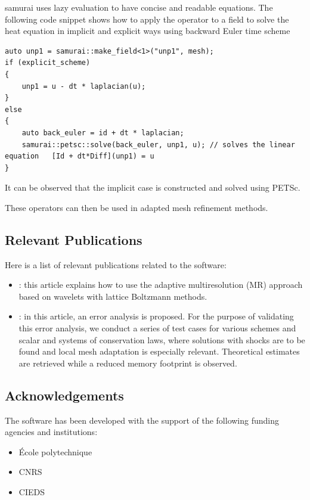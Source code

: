 samurai uses lazy evaluation to have concise and readable equations. The following code snippet shows how to apply the operator to a field to solve the heat equation in implicit and explicit ways using backward Euler time scheme

\begin{listing}[ht]
    \begin{verbatim}
auto unp1 = samurai::make_field<1>("unp1", mesh);
if (explicit_scheme)
{
    unp1 = u - dt * laplacian(u);
}
else
{
    auto back_euler = id + dt * laplacian;
    samurai::petsc::solve(back_euler, unp1, u); // solves the linear equation   [Id + dt*Diff](unp1) = u
}
\end{verbatim}
\end{listing}

It can be observed that the implicit case is constructed and solved using PETSc.

These operators can then be used in adapted mesh refinement methods.

\subsection{Relevant Publications}
\label{sec:Samurai:publications}

Here is a list of relevant publications related to the software:

\begin{itemize}
    \item \cite{bellotti_multidimensional_2022}: this article explains how to use the adaptive multiresolution (MR) approach based on wavelets with lattice Boltzmann methods.
    \item \cite{bellotti_multiresolution-based_2022}: in this article, an error analysis is proposed. For the purpose of validating this error analysis, we conduct a series of test cases for various schemes and scalar and systems of conservation laws, where solutions with shocks are to be found and local mesh adaptation is especially relevant. Theoretical estimates are retrieved while a reduced memory footprint is observed.
\end{itemize}

\subsection{Acknowledgements}
\label{sec::Samurai:acknowledgements}

The software has been developed with the support of the following funding agencies and institutions:
\begin{itemize}
    \item \'Ecole polytechnique
    \item CNRS
    \item CIEDS
 \end{itemize}
